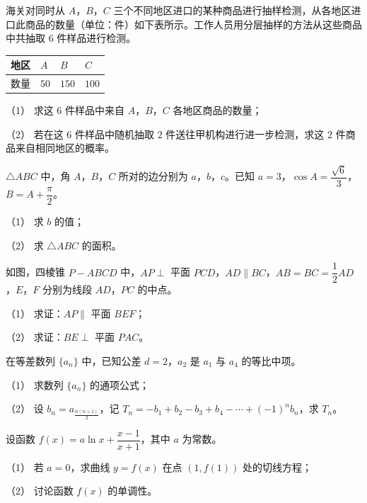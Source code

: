 \begin{question}
海关对同时从 $A$，$B$，$C$ 三个不同地区进口的某种商品进行抽样检测，从各地区进口此商品的数量（单位：件）如下表所示。工作人员用分层抽样的方法从这些商品中共抽取 $6$ 件样品进行检测。

\begin{center}
\begin{tabular}{llll}
\toprule
地区 & $A$ & $B$ & $C$ \\
\midrule
数量 & $50$ & $150$ & $100$ \\
\bottomrule
\end{tabular}
\end{center}

（1） 求这 $6$ 件样品中来自 $A$，$B$，$C$ 各地区商品的数量；

（2） 若在这 $6$ 件样品中随机抽取 $2$ 件送往甲机构进行进一步检测，求这 $2$ 件商品来自相同地区的概率。

\end{question}
\begin{question}
$\triangle ABC$ 中，角 $A$，$B$，$C$ 所对的边分别为 $a$，$b$，$c$。已知 $a=3$，$\cos A=\dfrac{\sqrt6}3$，$B=A+\dfrac\pi2$。

（1） 求 $b$ 的值；

（2） 求 $\triangle ABC$ 的面积。

\Needspace{0.4\textheight}
\end{question}
\begin{question}
如图，四棱锥 $P-ABCD$ 中，$AP\perp$ 平面 $PCD$，$AD\parallel BC$，$AB=BC=\dfrac12AD$，$E$，$F$ 分别为线段 $AD$，$PC$ 的中点。
\nopagebreak[4]
\begin{center}\end{center}
\nopagebreak[4]
（1） 求证：$AP\parallel$ 平面 $BEF$；

（2） 求证：$BE\perp$ 平面 $PAC$。

\end{question}
\begin{question}
在等差数列 $\{a_n\}$ 中，已知公差 $d=2$，$a_2$ 是 $a_1$ 与 $a_4$ 的等比中项。

（1） 求数列 $\{a_n\}$ 的通项公式；

（2） 设 $b_n=a_{\frac{n(n+1)}2}$，记 $T_n=-b_1+b_2-b_3+b_4-\cdots+(-1)^nb_n$，求 $T_n$。

\end{question}
\begin{question}
设函数 $f(x)=a\ln x+\dfrac{x-1}{x+1}$，其中 $a$ 为常数。

（1） 若 $a=0$，求曲线 $y=f(x)$ 在点 $(1,f(1))$ 处的切线方程；

（2） 讨论函数 $f(x)$ 的单调性。

\end{question}
